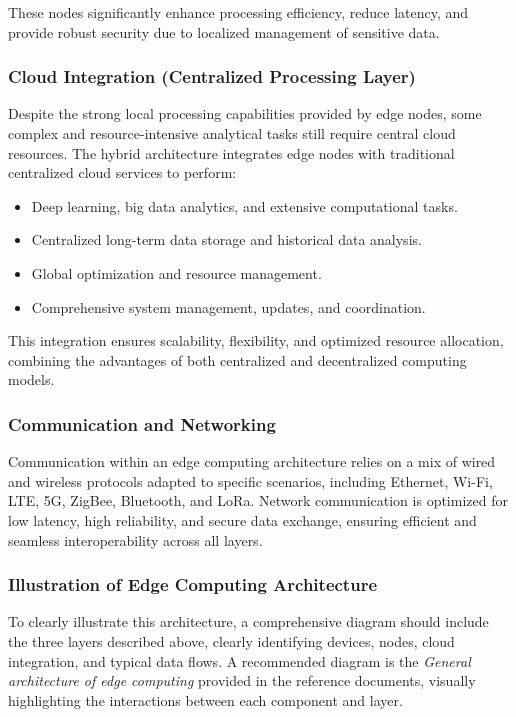 \documentclass[runningheads]{llncs}
\begin{document}
These nodes significantly enhance processing efficiency, reduce latency, and provide robust security due to localized management of sensitive data.

\subsubsection{Cloud Integration (Centralized Processing Layer)}
Despite the strong local processing capabilities provided by edge nodes, some complex and resource-intensive analytical tasks still require central cloud resources. The hybrid architecture integrates edge nodes with traditional centralized cloud services to perform:
\begin{itemize}
    \item Deep learning, big data analytics, and extensive computational tasks.
    \item Centralized long-term data storage and historical data analysis.
    \item Global optimization and resource management.
    \item Comprehensive system management, updates, and coordination.
\end{itemize}

This integration ensures scalability, flexibility, and optimized resource allocation, combining the advantages of both centralized and decentralized computing models.

\subsubsection{Communication and Networking}
Communication within an edge computing architecture relies on a mix of wired and wireless protocols adapted to specific scenarios, including Ethernet, Wi-Fi, LTE, 5G, ZigBee, Bluetooth, and LoRa. Network communication is optimized for low latency, high reliability, and secure data exchange, ensuring efficient and seamless interoperability across all layers.

\subsubsection{Illustration of Edge Computing Architecture}
To clearly illustrate this architecture, a comprehensive diagram should include the three layers described above, clearly identifying devices, nodes, cloud integration, and typical data flows. A recommended diagram is the \textit{General architecture of edge computing} provided in the reference documents, visually highlighting the interactions between each component and layer.
\end{document}
